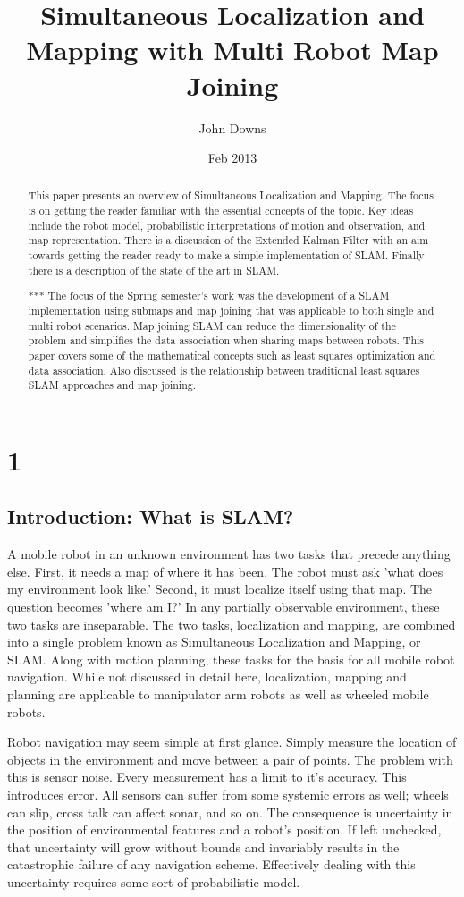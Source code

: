 \documentclass[12pt]{report}
\title{Simultaneous Localization and Mapping with Multi Robot Map Joining}
\author{John Downs}
\date{Feb 2013}
\begin{document}
\maketitle


\begin{abstract}
This paper presents an overview of Simultaneous Localization and Mapping.  The focus is on getting the reader familiar with the essential concepts of the topic.  Key ideas include the robot model, probabilistic interpretations of motion and observation, and map representation.  There is a discussion of the Extended Kalman Filter with an aim towards getting the reader ready to make a simple implementation of SLAM.  Finally there is a description of the state of the art in SLAM.

***
The focus of the Spring semester's work was the development of a SLAM implementation using submaps and map joining that was applicable to both single and multi robot scenarios.  Map joining SLAM can reduce the dimensionality of the problem and simplifies the data association when sharing maps between robots.  This paper covers some of the mathematical concepts such as least squares optimization and data association.  Also discussed is the relationship between traditional least squares SLAM approaches and map joining.
\end{abstract}
 
\chapter{1}
\section{Introduction: What is SLAM?}

A mobile robot in an unknown environment has two tasks that precede anything else.  First, it needs a map of where it has been.  The robot must ask 'what does my environment look like.'  Second, it must localize itself using that map.  The question becomes 'where am I?'  In any partially observable environment, these two tasks are inseparable.  The two tasks, localization and mapping, are combined into a single problem known as Simultaneous Localization and Mapping, or SLAM.  Along with motion planning, these tasks for the basis for all mobile robot navigation.  While not discussed in detail here, localization, mapping and planning are applicable to manipulator arm robots as well as wheeled mobile robots.

Robot navigation may seem simple at first glance.  Simply measure the location of objects in the environment and move between a pair of points.  The problem with this is sensor noise.  Every measurement has a limit to it's accuracy.  This introduces error.  All sensors can suffer from some systemic errors as well; wheels can slip, cross talk can affect sonar, and so on.  The consequence is uncertainty in the position of environmental features and a robot's position.  If left unchecked, that uncertainty will grow without bounds and invariably results in the catastrophic failure of any navigation scheme.  Effectively dealing with this uncertainty requires some sort of probabilistic model.
\end{document}
